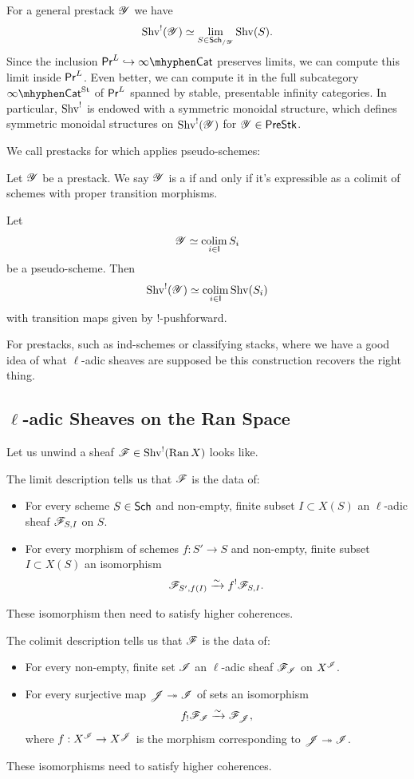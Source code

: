 \documentclass[oneside]{amsart}
\begin{document}
For a general prestack $\mathscr{Y}$ we have
\[
\operatorname{Shv}^{!}(\mathscr{Y}) \simeq \lim_{S\in \mathsf{Sch}_{/\mathscr{Y}}} \operatorname{Shv}(S).
\] 
Since the inclusion $\PrL\injto \iCat$ preserves limits, we can compute this limit inside $\mathsf{Pr}^L$. Even better, we can compute it in the full subcategory $\iCatSt$ of $\mathsf{Pr}^L$ spanned by stable, presentable infinity categories. In particular, $\operatorname{Shv}^{!}$ is endowed with a symmetric monoidal structure, which defines symmetric monoidal structures on $\operatorname{Shv}^{!}(\mathscr{Y})$ for $\mathscr{Y}\in \mathsf{PreStk}$.

We call prestacks for which  applies pseudo-schemes:
\begin{definition}
	Let $\mathscr{Y}$ be a prestack. We say $\mathscr{Y}$ is a  if and only if it's expressible as a colimit of schemes with proper transition morphisms.
\end{definition}
\begin{corollary}
	Let
	\[
		\mathscr{Y} \simeq \operatorname*{colim}_{i\in \mathsf{I}} S_i
	\] 
	be a pseudo-scheme. Then
	\[
		\operatorname{Shv}^{!}(\mathscr{Y}) \simeq \operatorname*{colim}_{i\in \mathsf{I}}\operatorname{Shv}(S_i)
	\] 
	with transition maps given by $!$-pushforward.
\end{corollary}
\begin{remark}
	For prestacks, such as ind-schemes or classifying stacks, where we have a good idea of what $\ell$-adic sheaves are supposed be this construction recovers the right thing.
\end{remark}

\subsection{\texorpdfstring{$\ell$-adic Sheaves on the Ran Space}{l-adic Sheaves on the Ran Space}}
Let us unwind a sheaf $\mathscr{F}\in \operatorname{Shv}^{!}(\operatorname{Ran} X)$ looks like.

The limit description tells us that $\mathscr{F}$ is the data of:
\begin{itemize}
	\item For every scheme $S\in \mathsf{Sch}$ and non-empty, finite subset $I\subset X(S)$ an $\ell$-adic sheaf $\mathscr{F}_{S,I}$ on $S$.
	\item For every morphism of schemes $f:S'\to S$ and non-empty, finite subset $I\subset X(S)$ an isomorphism
		\[
		\mathscr{F}_{S',f(I)} \xrightarrow{\sim} f^{!}\mathscr{F}_{S,I}.
		\] 
\end{itemize}
These isomorphism then need to satisfy higher coherences.

The colimit description tells us that $\mathscr{F}$ is the data of:
\begin{itemize}
	\item For every non-empty, finite set $\mathscr{I}$ an $\ell$-adic sheaf $\mathscr{F}_{\mathscr{I}}$ on $X^{\mathscr{I}}$.
	\item For every surjective map $\mathscr{J}\twoheadrightarrow \mathscr{I}$ of sets an isomorphism
		\[
		f_!\mathscr{F}_{\mathscr{I}} \xrightarrow{\sim} \mathscr{F}_{\mathscr{J}},
		\] 
		where $f:X^{\CI}\to X^{\CJ}$ is the morphism corresponding to $\mathscr{J}\twoheadrightarrow \mathscr{I}$.
\end{itemize}
These isomorphisms need to satisfy higher coherences.
\end{document}
